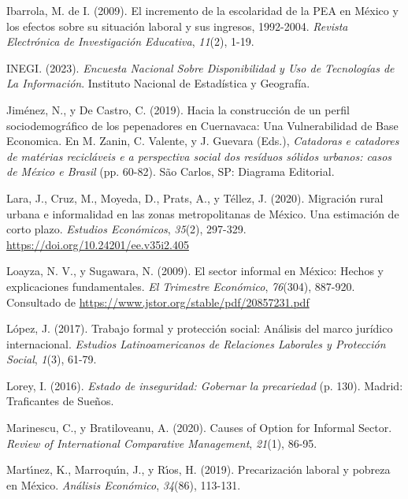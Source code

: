 \documentclass[
  spanish,
  11.5pt,
  170mm x 240mmpaper,
]{scrbook}
\newlength{\cslhangindent}
\newenvironment{CSLReferences}[2] %
 {\begin{list}{}{%
  \setlength{\itemindent}{0pt}
  \setlength{\leftmargin}{0pt}
  \setlength{\parsep}{0pt}
  \ifodd #1
   \setlength{\leftmargin}{\cslhangindent}
   \setlength{\itemindent}{-1\cslhangindent}
  \fi
  \setlength{\itemsep}{#2\baselineskip}}}
 {\end{list}}
\begin{document}
\begin{CSLReferences}{1}{0}
Ibarrola, M. de I. (2009). {El incremento de la escolaridad de la PEA en
México y los efectos sobre su situación laboral y sus ingresos,
1992-2004}. \emph{Revista Electrónica de Investigación Educativa},
\emph{11}(2), 1-19.

INEGI. (2023). \emph{Encuesta {Nacional} Sobre {Disponibilidad} y {Uso}
de {Tecnologías} de La {Información}}. Instituto Nacional de Estadística
y Geografía.

Jiménez, N., y De Castro, C. (2019). {Hacia la construcción de un perfil
sociodemográfico de los pepenadores en Cuernavaca: Una Vulnerabilidad de
Base Economica}. En M. Zanin, C. Valente, y J. Guevara (Eds.),
\emph{{Catadoras e catadores de matérias recicláveis e a perspectiva
social dos resíduos sólidos urbanos: casos de México e Brasil}} (pp.
60-82). São Carlos, SP: Diagrama Editorial.

Lara, J., Cruz, M., Moyeda, D., Prats, A., y Téllez, J. (2020).
{Migración rural urbana e informalidad en las zonas metropolitanas de
México. Una estimación de corto plazo}. \emph{Estudios Económicos},
\emph{35}(2), 297-329. \url{https://doi.org/10.24201/ee.v35i2.405}

Loayza, N. V., y Sugawara, N. (2009). {El sector informal en México:
Hechos y explicaciones fundamentales}. \emph{El Trimestre Económico},
\emph{76}(304), 887-920. Consultado de
\url{https://www.jstor.org/stable/pdf/20857231.pdf}

López, J. (2017). {Trabajo formal y protección social: Análisis del
marco jurídico internacional}. \emph{Estudios Latinoamericanos de
Relaciones Laborales y Protección Social}, \emph{1}(3), 61-79.

Lorey, I. (2016). \emph{{Estado de inseguridad: Gobernar la
precariedad}} (p. 130). Madrid: Traficantes de Sueños.

Marinescu, C., y Bratiloveanu, A. (2020). Causes of Option for Informal
Sector. \emph{Review of International Comparative Management},
\emph{21}(1), 86-95.

Martı́nez, K., Marroquı́n, J., y Rı́os, H. (2019). {Precarización laboral y
pobreza en México}. \emph{Análisis Económico}, \emph{34}(86), 113-131.


\end{CSLReferences}
\end{document}
